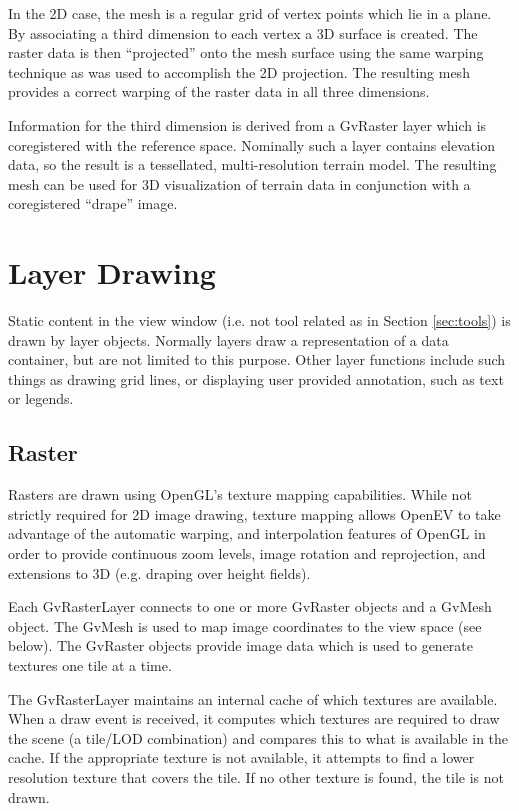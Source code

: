 \documentclass{openevreport}
\begin{document}
In the 2D case, the mesh is a regular grid of vertex points which lie 
in a plane.  By associating a third dimension to each vertex a 3D surface is 
created.  The raster data is then ``projected'' onto the mesh surface using 
the same warping technique as was used to accomplish the 2D projection.  The 
resulting mesh provides a correct warping of the raster data in all three 
dimensions.

Information for the third dimension is derived
from a GvRaster layer which is coregistered with the reference space.
Nominally such a layer contains elevation data, so the result is
a tessellated, multi-resolution terrain model.  The resulting mesh
can be used for 3D visualization of terrain data in
conjunction with a coregistered ``drape'' image.

\chapter{Layer Drawing}

Static content in the view window (i.e. not tool related as in Section
\ref{sec:tools}) is drawn by layer objects.  Normally layers draw a
representation of a data container, but are not limited to this
purpose.  Other layer functions include such things as drawing grid
lines, or displaying user provided annotation, such as text or
legends.

\section{Raster}

Rasters are drawn using OpenGL's texture mapping capabilities.
While not strictly required for 2D image drawing, texture mapping
allows OpenEV to take advantage of the automatic warping, and 
interpolation features 
of OpenGL in order to provide continuous zoom levels, image rotation
and reprojection, and extensions to 3D (e.g. draping over height
fields).

Each GvRasterLayer connects to one or more GvRaster objects and a
GvMesh object.  The GvMesh is used to map image coordinates to the
view space (see below).  The GvRaster objects provide image data which 
is used to generate textures one tile at a time.

The GvRasterLayer maintains an internal cache of which textures are
available.  When a draw event is received, it computes which textures
are required to draw the scene (a tile/LOD combination) and compares
this to what is available in the cache.  If the appropriate texture is
not available, it attempts to find a lower resolution texture that
covers the tile.  If no other texture is found, the tile is not
drawn.
\end{document}
